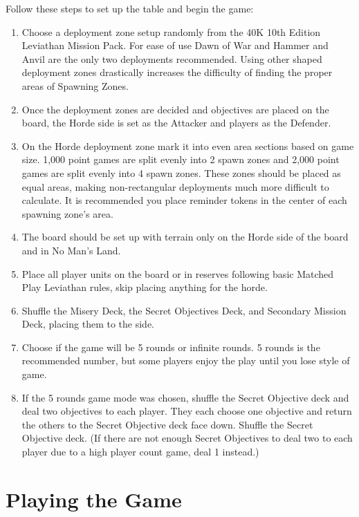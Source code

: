 \documentclass{HordeModeTarot}
\begin{document}
Follow these steps to set up the table and begin the game:

\begin{enumerate}
\item{} Choose a deployment zone setup randomly from the 40K 10th Edition Leviathan Mission Pack.  For ease of use Dawn of War and Hammer and Anvil are the only two deployments recommended. Using other shaped deployment zones drastically increases the difficulty of finding the proper areas of Spawning Zones.
\item{} Once the deployment zones are decided and objectives are placed on the board, the Horde side is set as the Attacker and players as the Defender.
\item{} On the Horde deployment zone mark it into even area sections based on game size.  1,000 point games are split evenly into 2 spawn zones and 2,000 point games are split evenly into 4 spawn zones.  These zones should be placed as equal areas, making non-rectangular deployments much more difficult to calculate. It is recommended you place reminder tokens in the center of each spawning zone's area.
\item{} The board should be set up with terrain only on the Horde side of the board and in No Man's Land.
\item{} Place all player units on the board or in reserves following basic Matched Play Leviathan rules, skip placing anything for the horde.
\item{} Shuffle the Misery Deck, the Secret Objectives Deck, and Secondary Mission Deck, placing them to the side.
\item{} Choose if the game will be 5 rounds or infinite rounds.  5 rounds is the recommended number, but some players enjoy the play until you lose style of game.
\item{} If the 5 rounds game mode was chosen, shuffle the Secret Objective deck and deal two objectives to each player. They each choose one objective and return the others to the Secret Objective deck face down.  Shuffle the Secret Objective deck.  (If there are not enough Secret Objectives to deal two to each player due to a high player count game, deal 1 instead.)
\end{enumerate}

\section{Playing the Game}\hypertarget{playing-the-game}{}\label{playing-the-game}
\end{document}
